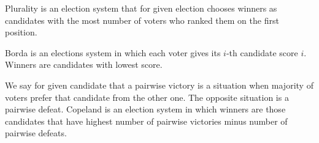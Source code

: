 \begin{exmp}[Plurality]
Plurality is an election system that for given election chooses winners as candidates
with the most number of voters who ranked them on the first position.
\end{exmp}

\begin{exmp}[Borda]
Borda is an elections system in which each voter gives its $i$-th candidate score $i$.
Winners are candidates with lowest score.
\end{exmp}

\begin{exmp}[Copeland]
We say for given candidate that a pairwise victory is a situation
when majority of voters prefer that candidate from the other one.
The opposite situation is a pairwise defeat.
Copeland is an election system in which winners are those candidates that have
highest number of pairwise victories minus number of pairwise defeats.
\end{exmp}
